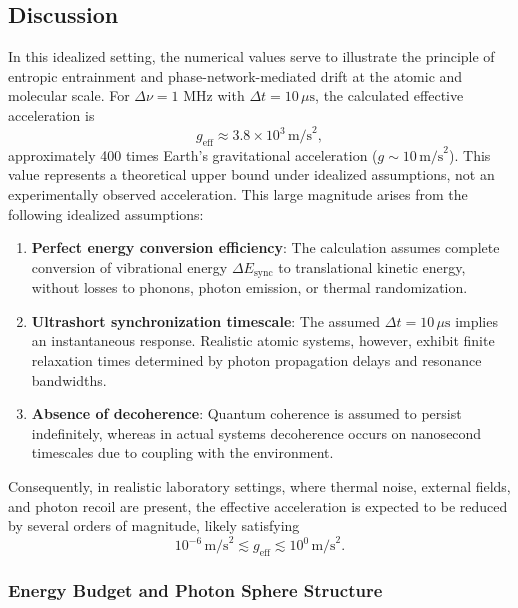 \documentclass[%
 reprint,
 amsmath,amssymb,
 aps,
 prb,
]{revtex4-2}
\numberwithin{equation}{section}
\begin{document}
\subsection{Discussion}

In this idealized setting, the numerical values serve to illustrate the principle of entropic entrainment and phase-network-mediated drift at the atomic and molecular scale. For $\Delta\nu = 1$ MHz with $\Delta t = 10\,\mu\text{s}$, the calculated effective acceleration is
\begin{equation}
g_\text{eff} \approx 3.8 \times 10^3\,\text{m/s}^2,
\end{equation}
approximately 400 times Earth's gravitational acceleration ($g \sim 10\,\text{m/s}^2$). This value represents a theoretical upper bound under idealized assumptions, not an experimentally observed acceleration. This large magnitude arises from the following idealized assumptions:

\begin{enumerate}
\item \textbf{Perfect energy conversion efficiency}: The calculation assumes complete conversion of vibrational energy $\Delta E_\text{sync}$ to translational kinetic energy, without losses to phonons, photon emission, or thermal randomization.

\item \textbf{Ultrashort synchronization timescale}: The assumed $\Delta t = 10\,\mu\text{s}$ implies an instantaneous response. Realistic atomic systems, however, exhibit finite relaxation times determined by photon propagation delays and resonance bandwidths.

\item \textbf{Absence of decoherence}: Quantum coherence is assumed to persist indefinitely, whereas in actual systems decoherence occurs on nanosecond timescales due to coupling with the environment.
\end{enumerate}

Consequently, in realistic laboratory settings, where thermal noise, external fields, and photon recoil \cite{Leibfried2003,Bloch2008,Wineland1998} are present, the effective acceleration is expected to be reduced by several orders of magnitude, likely satisfying
\begin{equation}
10^{-6}\,\text{m/s}^2 \lesssim g_\text{eff} \lesssim 10^{0}\,\text{m/s}^2.
\end{equation}

\subsubsection{Energy Budget and Photon Sphere Structure}
\end{document}
